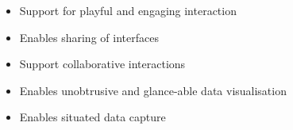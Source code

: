 \begin{itemize}
    \item Support for playful and engaging interaction
    \item Enables sharing of interfaces
    \item Support collaborative interactions
    \item Enables unobtrusive and glance-able data visualisation
    \item Enables situated data capture
\end{itemize}

